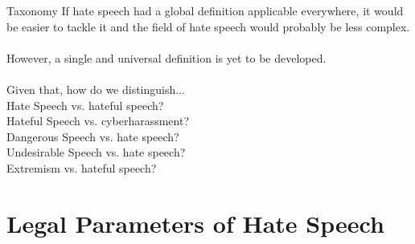 \documentclass[nobackground,dvipsnames,table]{beamer}
\begin{document}
\begin{frame}{Taxonomy}
    If hate speech had a global definition applicable everywhere, it would be easier to tackle it and the field of hate speech would probably be less complex.\\~\\

    However, a single and universal definition is yet to be developed.\\~\\

    Given that, how do we distinguish...\\
    Hate Speech vs. hateful speech?\\
    Hateful Speech vs. cyberharassment?\\
    Dangerous Speech vs. hate speech?\\
    Undesirable Speech vs. hate speech?\\
    Extremism vs. hateful speech?
\end{frame}

\section{Legal Parameters of Hate Speech}

\begin{frame}{}
    \thispagestyle{empty}
\end{frame}

\begin{frame}{}
    \thispagestyle{empty}
\end{frame}
\end{document}
